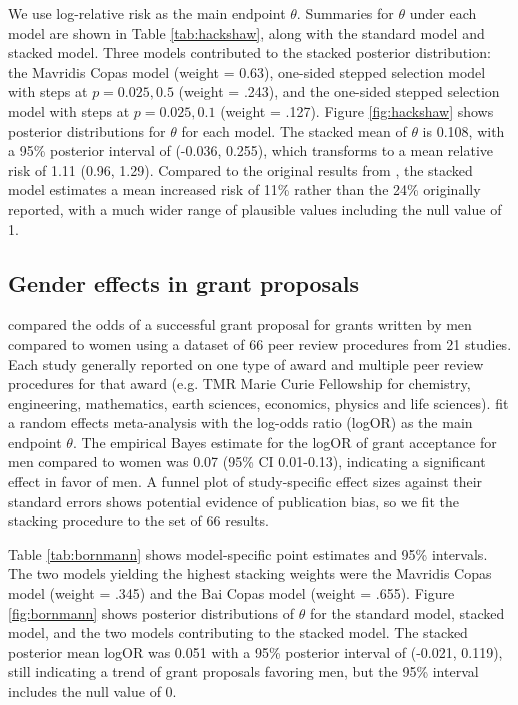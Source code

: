 \documentclass[12pt]{article}   	%
\numberwithin{equation}{section}
\begin{document}
We use log-relative risk as the main endpoint $\theta$. Summaries for $\theta$ under each model are shown in Table \ref{tab:hackshaw}, along with the standard model and stacked model. Three models contributed to the stacked posterior distribution: the Mavridis Copas model (weight = 0.63), one-sided stepped selection model with steps at $p=0.025, 0.5$ (weight = .243), and the one-sided stepped selection model with steps at $p=0.025, 0.1$ (weight = .127). Figure \ref{fig:hackshaw} shows posterior distributions for $\theta$ for each model. The stacked mean of $\theta$ is 0.108, with a 95\% posterior interval of (-0.036, 0.255), which transforms to a mean relative risk of 1.11 (0.96, 1.29). Compared to the original results from \citet{hackshaw1997}, the stacked model estimates a mean increased risk of 11\% rather than the 24\% originally reported, with a much wider range of plausible values including the null value of 1. 


\subsection{Gender effects in grant proposals}

\citet{bornmann2007gender} compared the odds of a successful grant proposal for grants written by men compared to women using a dataset of 66 peer review procedures from 21 studies. Each study generally reported on one type of award and multiple peer review procedures for that award (e.g. TMR Marie Curie Fellowship for chemistry, engineering, mathematics, earth sciences, economics, physics and life sciences). \citet{bornmann2007gender} fit a random effects meta-analysis with the log-odds ratio (logOR) as the main endpoint $\theta$. The empirical Bayes estimate for the logOR of grant acceptance for men compared to women was 0.07 (95\% CI 0.01-0.13), indicating a significant effect in favor of men. A funnel plot of study-specific effect sizes against their standard errors shows potential evidence of publication bias, so we fit the stacking procedure to the set of 66 results. 

Table \ref{tab:bornmann} shows model-specific point estimates and 95\% intervals. The two models yielding the highest stacking weights were the Mavridis Copas model (weight = .345) and the Bai Copas model (weight = .655). Figure \ref{fig:bornmann} shows posterior distributions of $\theta$ for the standard model, stacked model, and the two models contributing to the stacked model. The stacked posterior mean logOR was 0.051 with a 95\% posterior interval of (-0.021, 0.119), still indicating a trend of grant proposals favoring men, but the 95\% interval includes the null value of 0. 
\end{document}
